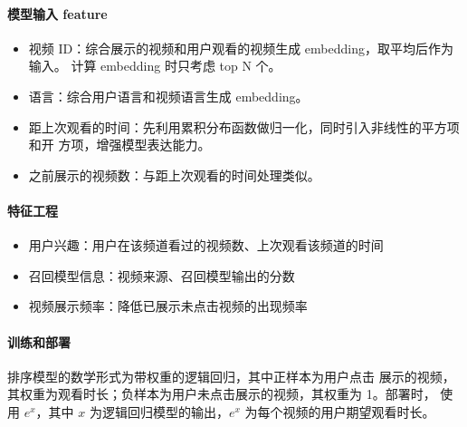 \paragraph{模型输入 feature}
\begin{itemize}
  \item 视频 ID：综合展示的视频和用户观看的视频生成 embedding，取平均后作为输入。
    计算 embedding 时只考虑 top N 个。
  \item 语言：综合用户语言和视频语言生成 embedding。
  \item 距上次观看的时间：先利用累积分布函数做归一化，同时引入非线性的平方项和开
    方项，增强模型表达能力。
  \item 之前展示的视频数：与距上次观看的时间处理类似。
\end{itemize}

\paragraph{特征工程}
\begin{itemize}
  \item 用户兴趣：用户在该频道看过的视频数、上次观看该频道的时间
  \item 召回模型信息：视频来源、召回模型输出的分数
  \item 视频展示频率：降低已展示未点击视频的出现频率
\end{itemize}

\paragraph{训练和部署} 排序模型的数学形式为带权重的逻辑回归，其中正样本为用户点击
展示的视频，其权重为观看时长；负样本为用户未点击展示的视频，其权重为 1。部署时，
使用 $e^{x}$，其中 $x$ 为逻辑回归模型的输出，$e^x$ 为每个视频的用户期望观看时长。

